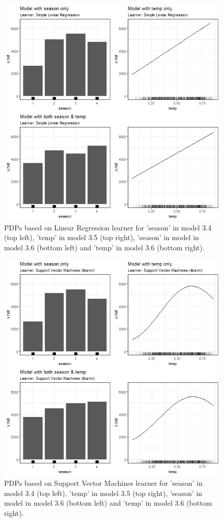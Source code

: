 \documentclass[]{krantz}
\begin{document}
\begin{figure}

{\centering \includegraphics[width=0.8\linewidth]{images/VK_PDP_11_Correlated_cat_num_LM} 

}

\caption{PDPs based on Linear Regression learner for 'season' in model 3.4 (top left), 'temp' in model 3.5 (top right), 'season' in model in model 3.6 (bottom left) and 'temp' in model 3.6 (bottom right).}\label{fig:Figure11}
\end{figure}

\begin{figure}

{\centering \includegraphics[width=0.8\linewidth]{images/VK_PDP_12_Correlated_cat_num_SVM} 

}

\caption{PDPs based on Support Vector Machines learner for 'season' in model 3.4 (top left), 'temp' in model 3.5 (top right), 'season' in model in model 3.6 (bottom left) and 'temp' in model 3.6 (bottom right).}\label{fig:Figure12}
\end{figure}
\end{document}
